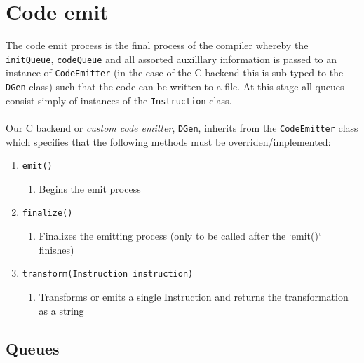 
\chapter{Code emit}

The code emit process is the final process of the compiler whereby
the \texttt{initQueue}, \texttt{codeQueue} and all assorted auxilllary
information is passed to an instance of \texttt{CodeEmitter} (in
the case of the C backend this is sub-typed to the \texttt{DGen}
class) such that the code can be written to a file. At this stage
all queues consist simply of instances of the \texttt{Instruction}
class.\\
\\
Our C backend or \emph{custom code emitter}, \texttt{DGen}, inherits
from the \texttt{CodeEmitter} class which specifies that the following
methods must be overriden/implemented:
\begin{enumerate}
\item \texttt{emit()}
\begin{enumerate}
\item Begins the emit process
\end{enumerate}
\item \texttt{finalize()}
\begin{enumerate}
\item Finalizes the emitting process (only to be called after the `emit()`
finishes)
\end{enumerate}
\item \texttt{transform(Instruction instruction)}
\begin{enumerate}
\item Transforms or emits a single Instruction and returns the transformation
as a string
\end{enumerate}
\end{enumerate}

\section{Queues}

